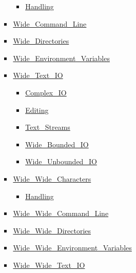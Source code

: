 \documentclass[english]{article}
\begin{document}
\begin{scriptsize}
\begin{multicols*}{5}
\begin{itemize}[leftmargin=0mm]
\begin{itemize}[leftmargin=5mm]
\begin{itemize}[leftmargin=5mm]
	  \begin{itemize}[leftmargin=5mm]
	  \item[] \href{http://www.ada-auth.org/standards/22rm/html/RM-A-3-5.html}{Handling}
	  \end{itemize}
	\item[] \href{http://www.ada-auth.org/standards/22rm/html/RM-A-15-1.html}{Wide\_Command\_Line}
	\item[] \href{http://www.ada-auth.org/standards/22rm/html/RM-A-16-2.html}{Wide\_Directories}
	\item[] \href{http://www.ada-auth.org/standards/22rm/html/RM-A-17-1.html}{Wide\_Environment\_Variables}
	\item[] \href{http://www.ada-auth.org/standards/22rm/html/RM-A-11.html}{Wide\_Text\_IO}
	  \begin{itemize}[leftmargin=5mm]
	  \item[] \href{http://www.ada-auth.org/standards/22rm/html/RM-G-1-4.html}{Complex\_IO}
	  \item[] \href{http://www.ada-auth.org/standards/22rm/html/RM-F-3-4.html}{Editing}
	  \item[] \href{http://www.ada-auth.org/standards/22rm/html/RM-A-12-3.html}{Text\_Streams}
	  \item[] \href{http://www.ada-auth.org/standards/22rm/html/RM-A-11.html}{Wide\_Bounded\_IO}
	  \item[] \href{http://www.ada-auth.org/standards/22rm/html/RM-A-11.html}{Wide\_Unbounded\_IO}
	  \end{itemize}
	\item[] \href{http://www.ada-auth.org/standards/22rm/html/RM-A-3-1.html}{Wide\_Wide\_Characters}
	  \begin{itemize}[leftmargin=5mm]
	  \item[] \href{http://www.ada-auth.org/standards/22rm/html/RM-A-3-6.html}{Handling}
	  \end{itemize}
	\item[] \href{http://www.ada-auth.org/standards/22rm/html/RM-A-15-1.html}{Wide\_Wide\_Command\_Line}
	\item[] \href{http://www.ada-auth.org/standards/22rm/html/RM-A-16-2.html}{Wide\_Wide\_Directories}
	\item[] \href{http://www.ada-auth.org/standards/22rm/html/RM-A-17-1.html}{Wide\_Wide\_Environment\_Variables}
	\item[] \href{http://www.ada-auth.org/standards/22rm/html/RM-A-11.html}{Wide\_Wide\_Text\_IO}
	  \begin{itemize}[leftmargin=5mm]

\end{itemize}
\end{itemize}
\end{itemize}
\end{itemize}
\end{multicols*}
\end{scriptsize}
\end{document}
